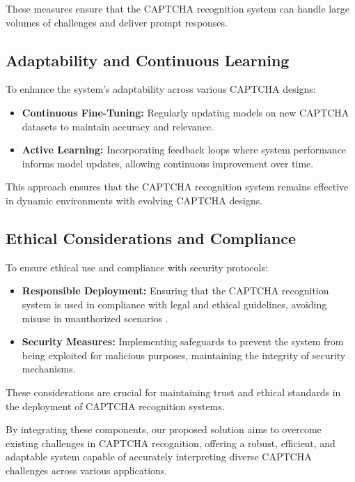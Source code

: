\documentclass[sigconf]{acmart}
\begin{document}
These measures ensure that the CAPTCHA recognition system can handle large volumes of challenges and deliver prompt responses.

\subsection{Adaptability and Continuous Learning}

To enhance the system's adaptability across various CAPTCHA designs:

\begin{itemize}
    \item \textbf{Continuous Fine-Tuning:} Regularly updating models on new CAPTCHA datasets to maintain accuracy and relevance.
    \item \textbf{Active Learning:} Incorporating feedback loops where system performance informs model updates, allowing continuous improvement over time.
\end{itemize}

This approach ensures that the CAPTCHA recognition system remains effective in dynamic environments with evolving CAPTCHA designs.

\subsection{Ethical Considerations and Compliance}

To ensure ethical use and compliance with security protocols:

\begin{itemize}
    \item \textbf{Responsible Deployment:} Ensuring that the CAPTCHA recognition system is used in compliance with legal and ethical guidelines, avoiding misuse in unauthorized scenarios \cite{turn0search8}.
    \item \textbf{Security Measures:} Implementing safeguards to prevent the system from being exploited for malicious purposes, maintaining the integrity of security mechanisms.
\end{itemize}

These considerations are crucial for maintaining trust and ethical standards in the deployment of CAPTCHA recognition systems.

By integrating these components, our proposed solution aims to overcome existing challenges in CAPTCHA recognition, offering a robust, efficient, and adaptable system capable of accurately interpreting diverse CAPTCHA challenges across various applications.
\end{document}
